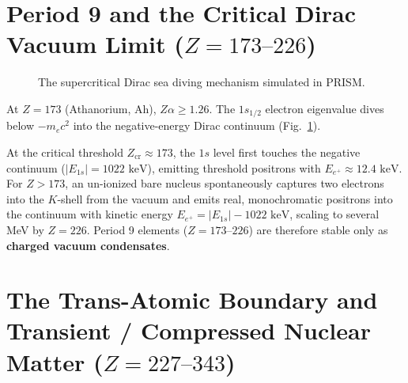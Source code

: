 \documentclass[10pt,twocolumn,a4paper]{article}
\begin{document}
\section{\texorpdfstring{Period 9 and the Critical Dirac Vacuum Limit ($Z = 173\text{--}226$)}{Period 9 and the Critical Dirac Vacuum Limit (Z = 173-226)}}

\begin{figure}[t]
\centering
{}
\caption{The supercritical Dirac sea diving mechanism simulated in PRISM.}
\label{fig:dirac_sea}
\end{figure}

At $Z = 173$ (Athanorium, $\text{Ah}$), $Z\alpha \ge 1.26$. The $1s_{1/2}$ electron eigenvalue dives below $-m_e c^2$ into the negative-energy Dirac continuum (Fig.~\ref{fig:dirac_sea}). 

At the critical threshold $Z_{\text{cr}} \approx 173$, the $1s$ level first touches the negative continuum ($|E_{1s}| = 1022\text{ keV}$), emitting threshold positrons with $E_{e^+} \approx 12.4\text{ keV}$. For $Z > 173$, an un-ionized bare nucleus spontaneously captures two electrons into the $K$-shell from the vacuum and emits real, monochromatic positrons into the continuum with kinetic energy $E_{e^+} = |E_{1s}| - 1022\text{ keV}$, scaling to several MeV by $Z = 226$. Period 9 elements ($Z = 173\text{--}226$) are therefore stable only as \textbf{charged vacuum condensates}.

\section{\texorpdfstring{The Trans-Atomic Boundary and Transient / Compressed Nuclear Matter ($Z = 227\text{--}343$)}{The Trans-Atomic Boundary and Transient / Compressed Nuclear Matter (Z = 227-343)}}
\end{document}
